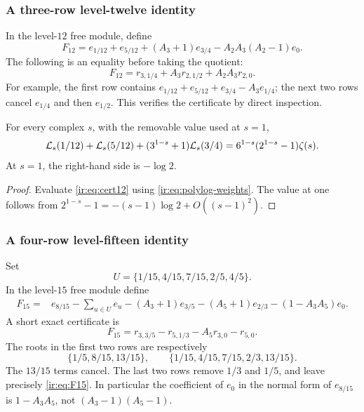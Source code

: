 \subsubsection{A three-row level-twelve identity}
In the level-$12$ free module, define
\[
 F_{12}=e_{1/12}+e_{5/12}+(A_3+1)e_{3/4}
        -A_2A_3(A_2-1)e_0.
\]
The following is an equality before taking the quotient:
\begin{equation}\label{ir:eq:cert12}
 F_{12}=r_{3,1/4}+A_3r_{2,1/2}+A_2A_3r_{2,0}.
\end{equation}
For example, the first row contains
$e_{1/12}+e_{5/12}+e_{3/4}-A_3e_{1/4}$; the next two rows cancel
$e_{1/4}$ and then $e_{1/2}$. This verifies the certificate by direct
inspection.

\begin{corollary}\label{ir:cor:level12}
For every complex $s$, with the removable value used at $s=1$,
\begin{align}
 \mathcal L_{s}(1/12)+\mathcal L_{s}(5/12)
 +(3^{1-s}+1)\mathcal L_{s}(3/4)
 =6^{1-s}(2^{1-s}-1)\zeta(s).
 \label{ir:eq:level12}
\end{align}
At $s=1$, the right-hand side is $-\log2$.
\end{corollary}
\begin{proof}
Evaluate \eqref{ir:eq:cert12} using
\eqref{ir:eq:polylog-weights}. The value at one follows from
$2^{1-s}-1=-(s-1)\log2+O((s-1)^2)$.
\end{proof}

\subsubsection{A four-row level-fifteen identity}
Set
\begin{equation}\label{ir:eq:U-set}
 U=\{1/15,4/15,7/15,2/5,4/5\}.
\end{equation}
In the level-$15$ free module define
\begin{align}
 F_{15}={}&e_{8/15}-\sum_{u\in U}e_u
 -(A_3+1)e_{3/5}-(A_5+1)e_{2/3}
 -(1-A_3A_5)e_0.
 \label{ir:eq:F15}
\end{align}
A short exact certificate is
\begin{equation}\label{ir:eq:cert15}
 F_{15}=r_{3,3/5}-r_{5,1/3}-A_5r_{3,0}-r_{5,0}.
\end{equation}
The roots in the first two rows are respectively
\[
 \{1/5,8/15,13/15\},\qquad
 \{1/15,4/15,7/15,2/3,13/15\}.
\]
The $13/15$ terms cancel. The last two rows remove $1/3$ and
$1/5$, and leave precisely \eqref{ir:eq:F15}. In particular the
coefficient of $e_0$ in the normal form of $e_{8/15}$ is
$1-A_3A_5$, not $(A_3-1)(A_5-1)$.

